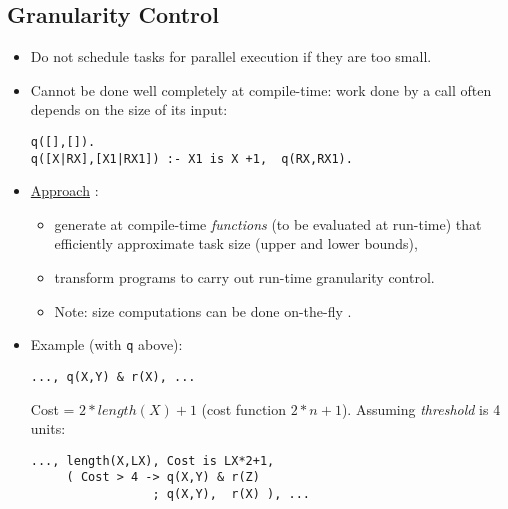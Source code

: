 \documentclass{article}
\renewcommand{\_}{\char'137}
\begin{document}
\centerline{
}

\subsection{Granularity Control}

\begin{itemize}
\item Do not schedule tasks for parallel execution if they are too small.
\item Cannot be done well completely at compile-time:
work done by a call often depends on the size
of its input:
\vspace{-3mm}
 \begin{verbatim}  
q([],[]).
q([X|RX],[X1|RX1]) :- X1 is X +1,  q(RX,RX1).
\end{verbatim}

\item \underline{Approach} \cite{granularity-jsc}: 
\begin{itemize}
\item generate at compile-time {\em functions} (to be evaluated
at run-time) that efficiently approximate task size (upper and lower
bounds), 
\item transform programs to carry out run-time granularity control.
\item Note: size computations can be done on-the-fly
  \cite{termsize-iclp95}. %
\end{itemize}

\item Example (with {\tt q} above):
\vspace{-3mm}
\begin{verbatim}
..., q(X,Y) & r(X), ...
\end{verbatim}
\vspace{-1mm}
Cost = $2*length(X)+1$ (cost function $2*n+1$).  Assuming
\emph{threshold} is 4 units:
\vspace{-1mm}
\begin{verbatim}
..., length(X,LX), Cost is LX*2+1, 
     ( Cost > 4 -> q(X,Y) & r(Z)
                 ; q(X,Y),  r(X) ), ...
\end{verbatim}
\end{itemize}
\end{document}
